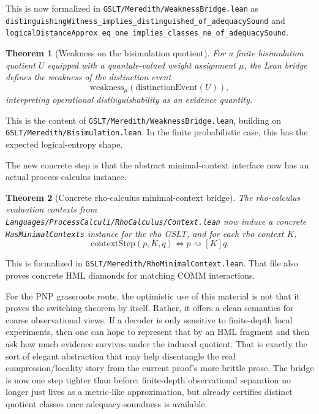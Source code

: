 \documentclass[11pt]{article}
\newtheorem{theorem}{Theorem}[section]
\theoremstyle{remark}
\begin{document}
\noindent
This is now formalized in \texttt{GSLT/Meredith/WeaknessBridge.lean} as
\texttt{distinguishingWitness\_implies\_distinguished\_of\_adequacySound} and
\texttt{logicalDistanceApprox\_eq\_one\_implies\_classes\_ne\_of\_adequacySound}.

\begin{theorem}[Weakness on the bisimulation quotient]
For a finite bisimulation quotient \(U\) equipped with a quantale-valued weight
assignment \(\mu\), the Lean bridge defines the weakness of the distinction event
\[
  \mathrm{weakness}_{\mu}(\mathrm{distinctionEvent}(U)),
\]
interpreting operational distinguishability as an evidence quantity.
\end{theorem}

\noindent
This is the content of \texttt{GSLT/Meredith/WeaknessBridge.lean}, building on
\texttt{GSLT/Meredith/Bisimulation.lean}.  In the finite probabilistic case, this
has the expected logical-entropy shape.

The new concrete step is that the abstract minimal-context interface now has an
actual process-calculus instance.

\begin{theorem}[Concrete rho-calculus minimal-context bridge]
The rho-calculus evaluation contexts from
\texttt{Languages/ProcessCalculi/RhoCalculus/Context.lean} now induce a concrete
\texttt{HasMinimalContexts} instance for the rho GSLT, and for each rho context
\(K\),
\[
  \mathrm{contextStep}(p,K,q)
  \iff
  p \mathrel{\rightsquigarrow[K]} q.
\]
\end{theorem}

\noindent
This is formalized in \texttt{GSLT/Meredith/RhoMinimalContext.lean}.  That file
also proves concrete HML diamonds for matching COMM interactions.

For the PNP grassroots route, the optimistic use of this material is not that it
proves the switching theorem by itself.  Rather, it offers a clean semantics for
coarse observational views.  If a decoder is only sensitive to finite-depth local
experiments, then one can hope to represent that by an HML fragment and then ask
how much evidence survives under the induced quotient.  That is exactly the sort
of elegant abstraction that may help disentangle the real compression/locality
story from the current proof's more brittle prose.  The bridge is now one step
tighter than before: finite-depth observational separation no longer just lives
as a metric-like approximation, but already certifies distinct quotient classes
once adequacy-soundness is available.
\end{document}
